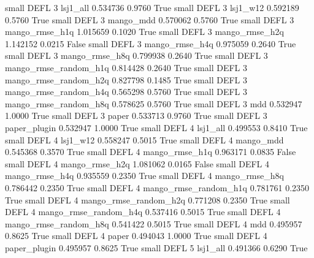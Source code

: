      small     DEFL                 3              lsj1_all   0.534736      0.9760    True
     small     DEFL                 3              lsj1_w12   0.592189      0.5760    True
     small     DEFL                 3             mango_mdd   0.570062      0.5760    True
     small     DEFL                 3        mango_rmse_h1q   1.015659      0.1020    True
     small     DEFL                 3        mango_rmse_h2q   1.142152      0.0215   False
     small     DEFL                 3        mango_rmse_h4q   0.975059      0.2640    True
     small     DEFL                 3        mango_rmse_h8q   0.799938      0.2640    True
     small     DEFL                 3 mango_rmse_random_h1q   0.814428      0.2640    True
     small     DEFL                 3 mango_rmse_random_h2q   0.827798      0.1485    True
     small     DEFL                 3 mango_rmse_random_h4q   0.565298      0.5760    True
     small     DEFL                 3 mango_rmse_random_h8q   0.578625      0.5760    True
     small     DEFL                 3                   mdd   0.532947      1.0000    True
     small     DEFL                 3                 paper   0.533713      0.9760    True
     small     DEFL                 3          paper_plugin   0.532947      1.0000    True
     small     DEFL                 4              lsj1_all   0.499553      0.8410    True
     small     DEFL                 4              lsj1_w12   0.558247      0.5015    True
     small     DEFL                 4             mango_mdd   0.545368      0.3570    True
     small     DEFL                 4        mango_rmse_h1q   0.963171      0.0835   False
     small     DEFL                 4        mango_rmse_h2q   1.081062      0.0165   False
     small     DEFL                 4        mango_rmse_h4q   0.935559      0.2350    True
     small     DEFL                 4        mango_rmse_h8q   0.786442      0.2350    True
     small     DEFL                 4 mango_rmse_random_h1q   0.781761      0.2350    True
     small     DEFL                 4 mango_rmse_random_h2q   0.771208      0.2350    True
     small     DEFL                 4 mango_rmse_random_h4q   0.537416      0.5015    True
     small     DEFL                 4 mango_rmse_random_h8q   0.541422      0.5015    True
     small     DEFL                 4                   mdd   0.495957      0.8625    True
     small     DEFL                 4                 paper   0.494043      1.0000    True
     small     DEFL                 4          paper_plugin   0.495957      0.8625    True
     small     DEFL                 5              lsj1_all   0.491366      0.6290    True
